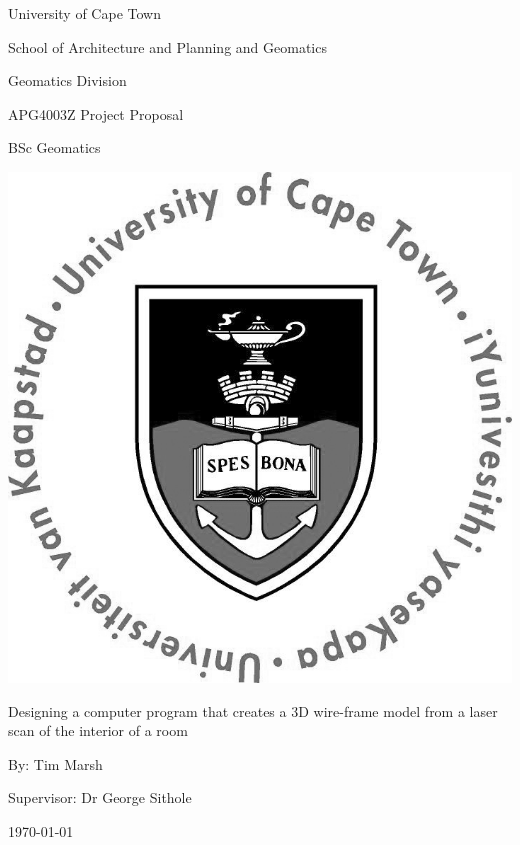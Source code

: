 \begin{center}
{\Huge University of Cape Town}
\linebreak \linebreak

{\LARGE School of Architecture and Planning and Geomatics}
\linebreak \linebreak

{\Large Geomatics Division}
\linebreak \linebreak


{\Large APG4003Z Project Proposal}
\linebreak

{\Large BSc Geomatics}
\linebreak \linebreak

\begin{center}
\includegraphics[width=0.5\linewidth]{includes/images/UCTcircular_logo1_CMYK.jpg}
\linebreak \linebreak
\end{center}

{\Large Designing a computer program that creates a 3D wire-frame model from a laser scan of the interior of a room}
\linebreak \linebreak

{\Large By: Tim Marsh}
\linebreak \linebreak

{\Large Supervisor: Dr George Sithole}
\linebreak \linebreak

{\Large \today}

\end{center}